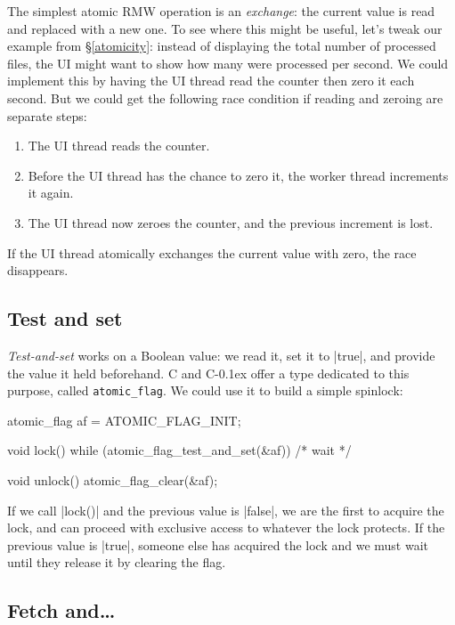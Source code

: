 \documentclass[fontsize=10pt, oneside]{scrartcl}
\newcommand{\monobox}[1]{\mbox{\texttt{#1}}}
\newcommand{\cplusplus}[1]{C\kern-0.1ex\raisebox{0.15ex}{\texttt{++}}}
\newcommand{\clang}[1]{C}
\newcommand{\introduce}[1]{\textit{#1}}
\newcommand{\secref}[1]{\hyperref[#1]{\textsc{\S}\ref*{#1}}}
\begin{document}
The simplest atomic \textsc{RMW} operation is an \introduce{exchange}:
the current value is read and replaced with a new one.
To see where this might be useful,
let's tweak our example from \secref{atomicity}:
instead of displaying the total number of processed files,
the \textsc{UI} might want to show how many were processed per second.
We could implement this by having the \textsc{UI} thread read the counter then zero it each second.
But we could get the following race condition if reading and zeroing are separate steps:
\begin{enumerate}
  \item The \textsc{UI} thread reads the counter.
  \item Before the \textsc{UI} thread has the chance to zero it,
        the worker thread increments it again.
  \item The \textsc{UI} thread now zeroes the counter, and the previous increment is lost.
\end{enumerate}
If the \textsc{UI} thread atomically exchanges the current value with zero,
the race disappears.

\subsection{Test and set}

\introduce{Test-and-set} works on a Boolean value:
we read it, set it to \cpp|true|, and provide the value it held beforehand.
\clang{} and \cplusplus{} offer a type dedicated to this purpose, called \monobox{atomic\_flag}.
We could use it to build a simple spinlock:
\label{spinlock}
\begin{ccode}
atomic_flag af = ATOMIC_FLAG_INIT;

void lock()
{
    while (atomic_flag_test_and_set(&af)) { /* wait */ }
}

void unlock() { atomic_flag_clear(&af); }
\end{ccode}
If we call \cc|lock()| and the previous value is \cc|false|,
we are the first to acquire the lock,
and can proceed with exclusive access to whatever the lock protects.
If the previous value is \cc|true|,
someone else has acquired the lock and we must wait until they release it by clearing the flag.

\subsection{Fetch and…}
\end{document}
